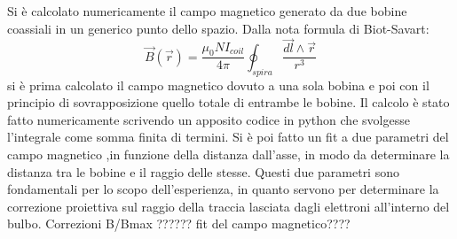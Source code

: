 Si è calcolato numericamente il campo magnetico generato da due bobine coassiali in un generico punto dello spazio. Dalla nota formula di Biot-Savart:\\
\begin{equation}
\vec{B}(\vec{r}) = \frac{\mu_0 N I_{coil}}{4\pi} \oint_{spira} \frac{\vec{dl}\land \vec{r}}{r^3} 
\end{equation}
si è prima calcolato il campo magnetico dovuto a una sola bobina e poi con il principio di sovrapposizione quello totale di entrambe le bobine. Il calcolo è stato fatto numericamente scrivendo un apposito codice in python che svolgesse l'integrale come somma finita di termini. Si è poi fatto un fit a due parametri del campo magnetico ,in funzione della distanza dall'asse, in modo da determinare la distanza tra le bobine e il raggio delle stesse. Questi due parametri sono fondamentali per lo scopo dell'esperienza, in quanto servono per determinare la correzione proiettiva sul raggio della traccia lasciata dagli elettroni all'interno del bulbo. Correzioni B/Bmax ??????  fit del campo magnetico????
